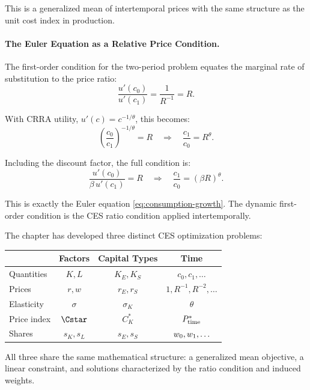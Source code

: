 This is a generalized mean of intertemporal prices with the same structure as the unit cost index in production.

\paragraph{The Euler Equation as a Relative Price Condition.}
The first-order condition for the two-period problem equates the marginal rate of substitution to the price ratio:
\begin{equation}
\frac{u'(c_0)}{u'(c_1)} = \frac{1}{R^{-1}} = R.
\label{eq:mrs-price}
\end{equation}

With CRRA utility, $u'(c) = c^{-1/\theta}$, this becomes:
\begin{equation}
\left( \frac{c_0}{c_1} \right)^{-1/\theta} = R \quad \Longrightarrow \quad \frac{c_1}{c_0} = R^\theta.
\label{eq:consumption-ratio-static}
\end{equation}

Including the discount factor, the full condition is:
\begin{equation}
\frac{u'(c_0)}{\beta \, u'(c_1)} = R \quad \Longrightarrow \quad \frac{c_1}{c_0} = (\beta R)^\theta.
\label{eq:euler-from-ratio}
\end{equation}

This is exactly the Euler equation \cref{eq:consumption-growth}. The dynamic first-order condition is the CES ratio condition applied intertemporally.

\begin{calloutimportant}
The chapter has developed three distinct CES optimization problems:
\begin{center}
\renewcommand{\arraystretch}{1.3}
\begin{tabular}{@{}lccc@{}}
\toprule
& \textbf{Factors} & \textbf{Capital Types} & \textbf{Time} \\
\midrule
Quantities & $K, L$ & $K_E, K_S$ & $c_0, c_1, \ldots$ \\
Prices & $r, w$ & $r_E, r_S$ & $1, R^{-1}, R^{-2}, \ldots$ \\
Elasticity & $\sigma$ & $\sigma_K$ & $\theta$ \\
Price index & $\Cstar$ & $C_K^*$ & $P^{*}_{\text{time}}$ \\
Shares & $s_K, s_L$ & $s_E, s_S$ & $w_0, w_1, \ldots$ \\
\bottomrule
\end{tabular}
\end{center}
All three share the same mathematical structure: a generalized mean objective, a linear constraint, and solutions characterized by the ratio condition and induced weights.
\end{calloutimportant}

